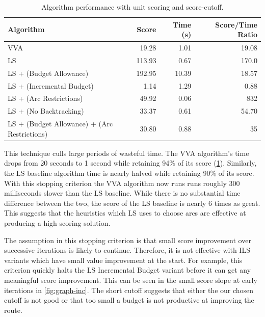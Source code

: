\documentclass[honors]{union-cs-thesis}
\begin{document}
\begin{table}
\begin{center}
\begin{tabular}{|l|r|r|r|}
    \hline
    \textbf{Algorithm} & \textbf{Score} & \textbf{Time (s)} & \textbf{Score/Time Ratio} \\
    \hline
    VVA & 19.28 & 1.01 & 19.08 \\
    \hline
    LS & 113.93 & 0.67 & 170.0 \\
    \hline
    LS + (Budget Allowance) & 192.95 & 10.39 & 18.57 \\
    \hline
    LS + (Incremental Budget) & 1.14 & 1.29 & 0.88 \\
    \hline
    LS + (Arc Restrictions) & 49.92 & 0.06 & 832 \\
    \hline
    LS + (No Backtracking) & 33.37 & 0.61 & 54.70 \\
    \hline
    LS + (Budget Allowance) + (Arc Restrictions) & 30.80 & 0.88 & 35  \\
    \hline
\end{tabular}
\caption{Algorithm performance with unit scoring and score-cutoff.}
\label{tab:score-cuttoff-results}
\end{center}
\end{table}

This technique culls large periods of wasteful time. The VVA algorithm's time drops from 20 seconds to 1 second while retaining 94\% of its score (\cref{tab:score-cuttoff-results}). Similarly, the LS baseline algorithm time is nearly halved while retaining 90\% of its score. With this stopping criterion the VVA algorithm now runs runs roughly 300 milliseconds slower than the LS baseline. While there is no substantial time difference between the two, the score of the LS baseline is nearly 6 times as great. This suggests that the heuristics which LS uses to choose arcs are effective at producing a high scoring solution.

The assumption in this stopping criterion is that small score improvement over successive iterations is likely to continue. Therefore, it is not effective with ILS variants which have small value improvement at the start. For example, this criterion quickly halts the LS Incremental Budget variant before it can get any meaningful score improvement. This can be seen in the small score slope at early iterations in \cref{fig:graph-inc}. The short cutoff suggests that either the our chosen cutoff is not good or that too small a budget is not productive at improving the route.
\end{document}
